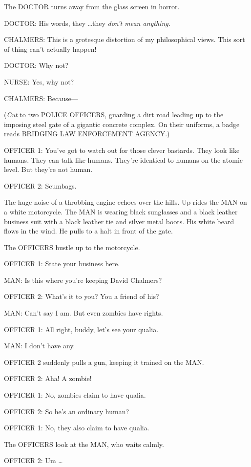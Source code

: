 {
 The DOCTOR turns away from the glass screen in horror.}

{
 DOCTOR: His words, they \ldots they \textit{don't
mean anything.}}

{
 CHALMERS: This is a grotesque distortion of my philosophical
views. This sort of thing can't actually happen!}

{
 DOCTOR: Why not?}

{
 NURSE: Yes, why not?}

{
 CHALMERS: Because---}

{
 (\textit{Cut} to two POLICE OFFICERS, guarding a dirt road leading
up to the imposing steel gate of a gigantic concrete complex. On their
uniforms, a badge reads BRIDGING LAW ENFORCEMENT AGENCY.)}

{
 OFFICER 1: You've got to watch out for those
clever bastards. They look like humans. They can talk like humans.
They're identical to humans on the atomic level. But
they're not human.}

{
 OFFICER 2: Scumbags.}

{
 The huge noise of a throbbing engine echoes over the hills. Up
rides the MAN on a white motorcycle. The MAN is wearing black
sunglasses and a black leather business suit with a black leather tie
and silver metal boots. His white beard flows in the wind. He pulls to
a halt in front of the gate.}

{
 The OFFICERS bustle up to the motorcycle.}

{
 OFFICER 1: State your business here.}

{
 MAN: Is this where you're keeping David Chalmers?}

{
 OFFICER 2: What's it to you? You a friend of his?}

{
 MAN: Can't say I am. But even zombies have
rights.}

{
 OFFICER 1: All right, buddy, let's see your
qualia.}

{
 MAN: I don't have any.}

{
 OFFICER 2 suddenly pulls a gun, keeping it trained on the MAN.}

{
 OFFICER 2: Aha! A zombie!}

{
 OFFICER 1: No, zombies claim to have qualia.}

{
 OFFICER 2: So he's an ordinary human?}

{
 OFFICER 1: No, they also claim to have qualia.}

{
 The OFFICERS look at the MAN, who waits calmly.}

{
 OFFICER 2: Um \ldots}

